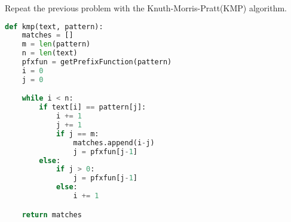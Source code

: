 \documentclass[12pt]{article}
\newenvironment{problem}[2][Problem]{\begin{trivlist}
\item[\hskip \labelsep {\bfseries #1}\hskip \labelsep {\bfseries #2.}]}{\end{trivlist}}
\begin{document}
\pagebreak
\begin{problem}{4} %
    Repeat the previous problem with the Knuth-Morris-Pratt(KMP) algorithm.
\begin{lstlisting}[language=Python, caption=Knuth-Morris-Pratt algorithm]
def kmp(text, pattern):
    matches = []
    m = len(pattern)
    n = len(text)
    pfxfun = getPrefixFunction(pattern)
    i = 0
    j = 0

    while i < n:
        if text[i] == pattern[j]:
            i += 1
            j += 1
            if j == m:
                matches.append(i-j)
                j = pfxfun[j-1]
        else:
            if j > 0:
                j = pfxfun[j-1]
            else:
                i += 1

    return matches


\end{lstlisting}
\end{problem}
\end{document}
